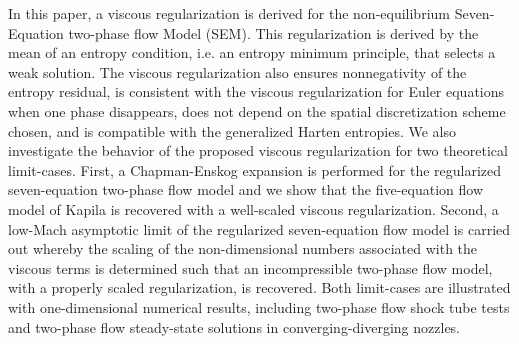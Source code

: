 In this paper, a viscous regularization is derived for the non-equilibrium Seven-Equation two-phase flow Model (SEM). 
This regularization is derived by the mean of an entropy condition, i.e. an entropy minimum principle, that selects a weak solution.
  
The viscous regularization also ensures nonnegativity of the entropy residual,    
is consistent with the viscous regularization for Euler equations when one phase disappears, does not depend on the spatial discretization scheme chosen, 
and is compatible with the generalized Harten entropies. 
%
We also investigate the behavior of the proposed viscous regularization for two theoretical 
  limit-cases. 
First, a Chapman-Enskog expansion is performed for the regularized seven-equation two-phase flow model and 
we show that the five-equation flow  model of Kapila is recovered with a well-scaled viscous regularization. 
Second, a low-Mach asymptotic limit of the regularized seven-equation flow model is carried out whereby the 
scaling of the non-dimensional numbers associated with the viscous terms is determined such that an 
incompressible two-phase flow model, with a properly scaled regularization, is recovered. 
Both limit-cases are illustrated with one-dimensional numerical results, including two-phase flow shock tube tests 
and two-phase flow steady-state solutions in converging-diverging nozzles.